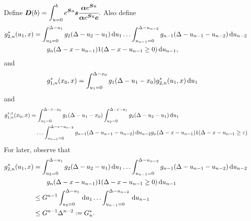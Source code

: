 Define \(\displaystyle\boldsymbol D(b) = \int_{u=0}^be^{\boldsymbol Su}\boldsymbol s \cfrac{\boldsymbol\alpha e^{\boldsymbol S u}}{\boldsymbol \alpha e^{\boldsymbol S u}\boldsymbol e}.\) Also define 
	\begin{align}
		g^*_{2,n}(u_1,x) &= \int_{u_2=0}^{\Delta-u_1}g_2(\Delta - u_2 - u_1)\, \mathrm{d} u_1 \dots \nonumber 
            	\int_{u_{n-1}=0}^{\Delta-u_{n-2}} g_{n-1}(\Delta - u_{n-1} - u_{n-2}) \, \mathrm{d} u_{n-2}
            	\\&\qquad{}g_{n}(\Delta - x-u_{n-1})1(\Delta-x-u_{n-1}\geq0)\, \mathrm{d} u_{n-1},
	\end{align}
	and 
	\begin{align}
		g^*_{1,n}(x_0,x) &= \int_{u_1=0}^{\Delta-x_0}g_1(\Delta - u_1 - x_0)g^*_{2,n}(u_1,x)\, \mathrm{d} u_1
	\end{align}
	and 
	\begin{align}
		g^{*,\varepsilon}_{1,n}(x_0,x) &= \int_{u_1=0}^{\Delta-\varepsilon-x_0}g_1(\Delta - u_1 - x_0)
		\int_{u_2=0}^{\Delta-\varepsilon-u_1}g_2(\Delta - u_2 - u_1)\, \mathrm{d} u_1  \nonumber 
		\\&\quad\hdots 
            	\int_{u_{n-1}=0}^{\Delta-\varepsilon-u_{n-2}} g_{n-1}(\Delta - u_{n-1} - u_{n-2}) \, \mathrm{d} u_{n-2}
            	g_{n}(\Delta-x-u_{n-1})1(\Delta-x-u_{n-1}\geq\varepsilon)
	\end{align}
	For later, observe that 
	\begin{align}
		g^*_{2,n}(u_1,x) &= \int_{u_2=0}^{\Delta-u_1}g_2(\Delta - u_2 - u_1)\, \mathrm{d} u_1 \dots \nonumber 
            	\int_{u_{n-1}=0}^{\Delta-u_{n-2}} g_{n-1}(\Delta - u_{n-1} - u_{n-2}) \, \mathrm{d} u_{n-2}
            	\\&\qquad{}g_{n}(\Delta - x-u_{n-1})1(\Delta-x-u_{n-1}\geq0)\, \mathrm{d} u_{n-1} \nonumber
		\\&\leq G^{n-1}\int_{u_2=0}^{\Delta-u_1}\, \mathrm{d} u_1 \dots\nonumber
            	\int_{u_{n-1}=0}^{\Delta-u_{n-2}}  \, \mathrm{d} u_{n-1}
		\\&\leq G^{n-1}\Delta^{n-2}:=G^*_n.
	\end{align}

